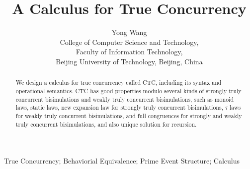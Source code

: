 \documentclass{fac}
\title[Draft of A Calculus for True Concurrency]
      {A Calculus for True Concurrency}
\author[Yong Wang]
    {Yong Wang\\
     College of Computer Science and Technology,\\
     Faculty of Information Technology,\\
     Beijing University of Technology, Beijing, China\\
     }
\begin{document}
\label{firstpage}

\makecorrespond

\maketitle

\begin{abstract}
We design a calculus for true concurrency called CTC, including its syntax and operational semantics. CTC has good properties modulo several kinds of strongly truly concurrent bisimulations and weakly truly concurrent bisimulations, such as monoid laws, static laws, new expansion law for strongly truly concurrent bisimulations, $\tau$ laws for weakly truly concurrent bisimulations, and full congruences for strongly and weakly truly concurrent bisimulations, and also unique solution for recursion.
\end{abstract}

\begin{keywords}
True Concurrency; Behaviorial Equivalence; Prime Event Structure; Calculus
\end{keywords}

















\label{lastpage}
\end{document}

